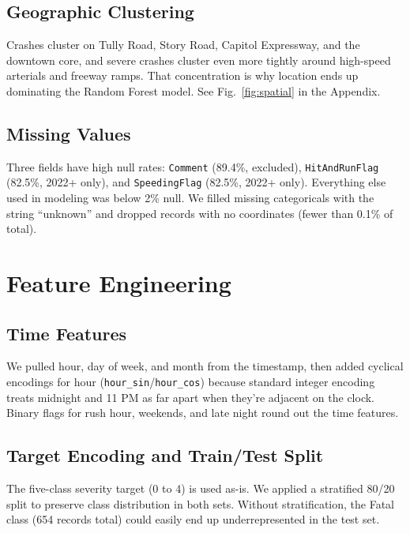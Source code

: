 \documentclass[conference]{IEEEtran}
\begin{document}
\subsection{Geographic Clustering}

Crashes cluster on Tully Road, Story Road, Capitol Expressway, and the downtown core, and severe crashes cluster even more tightly around high-speed arterials and freeway ramps. That concentration is why location ends up dominating the Random Forest model. See Fig.~\ref{fig:spatial} in the Appendix.

\subsection{Missing Values}

Three fields have high null rates: \texttt{Comment} (89.4\%, excluded), \texttt{HitAndRunFlag} (82.5\%, 2022+ only), and \texttt{SpeedingFlag} (82.5\%, 2022+ only). Everything else used in modeling was below 2\% null. We filled missing categoricals with the string ``unknown'' and dropped records with no coordinates (fewer than 0.1\% of total).

\section{Feature Engineering}

\subsection{Time Features}

We pulled hour, day of week, and month from the timestamp, then added cyclical encodings for hour (\texttt{hour\_sin}/\texttt{hour\_cos}) because standard integer encoding treats midnight and 11 PM as far apart when they're adjacent on the clock. Binary flags for rush hour, weekends, and late night round out the time features.

\subsection{Target Encoding and Train/Test Split}

The five-class severity target (0 to 4) is used as-is. We applied a stratified 80/20 split to preserve class distribution in both sets. Without stratification, the Fatal class (654 records total) could easily end up underrepresented in the test set.
\end{document}
